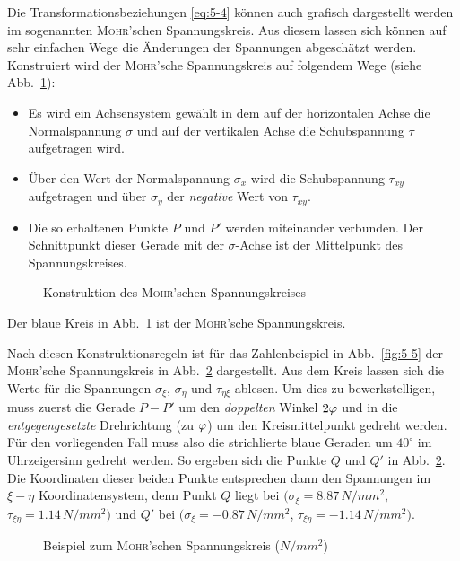 \FloatBarrier
Die Transformationsbeziehungen \eqref{eq:5-4} können auch grafisch dargestellt werden im sogenannten \textsc{Mo\-hr}'schen Spannungskreis.
Aus diesem lassen sich können auf sehr einfachen Wege die Änderungen der Spannungen abgeschätzt werden.
Konstruiert wird der \textsc{Mohr}'sche Spannungskreis auf folgendem Wege (siehe Abb.~\ref{fig:5-6}):
%
\begin{itemize}
	\item Es wird ein Achsensystem gewählt in dem auf der horizontalen Achse die Normalspannung $\sigma$ und auf der vertikalen Achse die Schubspannung $\tau$ aufgetragen wird.
	\item Über den Wert der Normalspannung $\sigma_x$ wird die Schubspannung $\tau_{xy}$ aufgetragen und über $\sigma_y$ der \emph{negative} Wert von $\tau_{xy}$.
	\item Die so erhaltenen Punkte $P$ und $P'$ werden miteinander verbunden. Der Schnittpunkt dieser Gerade mit der $\sigma$-Achse ist der Mittelpunkt des Spannungskreises.
\end{itemize} 
%
%
\begin{figure}[h!]
	\centering
	
	\caption{Konstruktion des \textsc{Mohr}'schen Spannungskreises}
	\label{fig:5-6}
\end{figure}
%
Der blaue Kreis in Abb.~\ref{fig:5-6} ist der \textsc{Mohr}'sche Spannungskreis. 
\FloatBarrier

Nach diesen Konstruktionsregeln ist für das Zahlenbeispiel in Abb.~\ref{fig:5-5} der \textsc{Mohr}'sche Spannungskreis in Abb.~\ref{fig:5-7} dargestellt.
Aus dem Kreis lassen sich die Werte für die Spannungen $\sigma_\xi$, $\sigma_\eta$ und $\tau_{\eta\xi}$ ablesen.
Um dies zu bewerkstelligen, muss zuerst die Gerade $P-P'$ um den \emph{doppelten} Winkel $2\varphi$ und in die \emph{entgegengesetzte} Drehrichtung (zu $\varphi$) um den Kreismittelpunkt gedreht werden.
Für den vorliegenden Fall muss also die strichlierte blaue Geraden um $40^\circ$ im Uhrzeigersinn gedreht werden.
So ergeben sich die Punkte $Q$ und $Q'$ in Abb.~\ref{fig:5-7}.
Die Koordinaten dieser beiden Punkte entsprechen dann den Spannungen im $\xi-\eta$ Koordinatensystem, denn Punkt $Q$ liegt bei $(\sigma_\xi=8.87\,\unit{N/mm^2}$, $\tau_{\xi\eta}=1.14\,\unit{N/mm^2})$ und  $Q'$ bei $(\sigma_\xi=-0.87\,\unit{N/mm^2}$, $\tau_{\xi\eta}=-1.14\,\unit{N/mm^2})$.
%
\begin{figure}[h!]
	\centering
	
	\caption{Beispiel zum \textsc{Mohr}'schen Spannungskreis ($\unit{N/mm^2}$)}
	\label{fig:5-7}
\end{figure}
%

